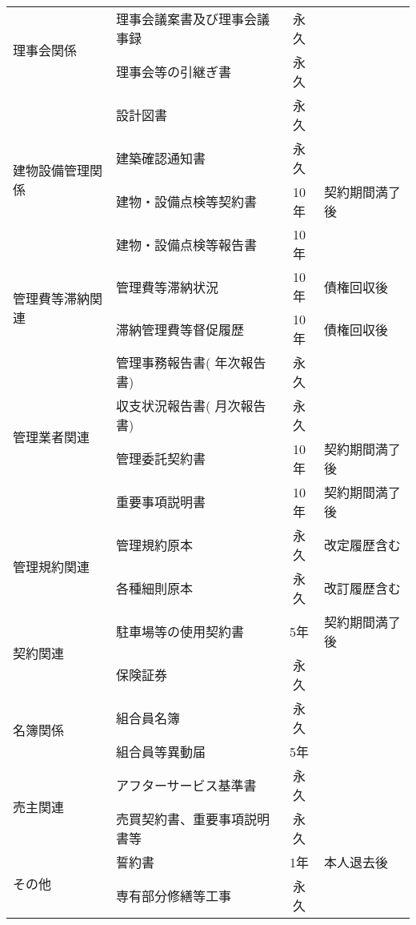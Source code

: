\documentclass[12pt,uplatex]{jsarticle}
\begin{document}
\begin{table}[htbp]
{\begin{tabular}{|l|l|c|l|}
      \multirow{2}{*}{理事会関係} & 理事会議案書及び理事会議事録 & 永久 &  \\ \cline{2-4}
                                & 理事会等の引継ぎ書 & 永久 & \\ \cline{2-4}
                                \hline
      \multirow{4}{*}{建物設備管理関係} & 設計図書 & 永久 & \\ \cline{2-4}
                                & 建築確認通知書 & 永久 & \\ \cline{2-4}
                                & 建物・設備点検等契約書 & 10年 & 契約期間満了後 \\ \cline{2-4}
                                & 建物・設備点検等報告書 & 10年 & \\ \cline{2-4}
                                \hline
      \multirow{2}{*}{管理費等滞納関連} & 管理費等滞納状況 & 10年 &  債権回収後 \\ \cline{2-4}
                                & 滞納管理費等督促履歴 & 10年 & 債権回収後\\ \cline{2-4}
                                \hline
      \multirow{4}{*}{管理業者関連} & 管理事務報告書( 年次報告書) & 永久 & \\ \cline{2-4}
                                & 収支状況報告書( 月次報告書) & 永久 & \\ \cline{2-4}
                                & 管理委託契約書 & 10年 & 契約期間満了後 \\ \cline{2-4}
                                &  重要事項説明書 & 10年 & 契約期間満了後 \\ \cline{2-4}
                                \hline
      \multirow{2}{*}{管理規約関連} & 管理規約原本 & 永久 & 改定履歴含む \\ \cline{2-4}
                                & 各種細則原本 & 永久 & 改訂履歴含む \\ \cline{2-4}
                                \hline
      \multirow{2}{*}{契約関連} & 駐車場等の使用契約書 & 5年 & 契約期間満了後 \\ \cline{2-4}
                                &  保険証券 & 永久 &  \\ \cline{2-4}
                                \hline
      \multirow{2}{*}{名簿関係} & 組合員名簿 & 永久 &  \\ \cline{2-4}
                                &  組合員等異動届 & 5年 &  \\ \cline{2-4}
                                \hline
      \multirow{2}{*}{売主関連} & アフターサービス基準書 & 永久 &  \\ \cline{2-4}
                                & 売買契約書、重要事項説明書等 & 永久 &  \\ \cline{2-4}
                                \hline
      \multirow{2}{*}{その他} & 誓約書 & 1年 & 本人退去後 \\ \cline{2-4}
                                &  専有部分修繕等工事 & 永久 & \\ \cline{2-4}
                                \hline
    \end{tabular}
  }
\end{table}
\end{document}
